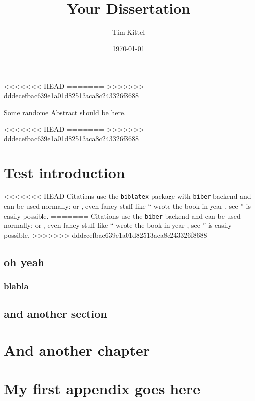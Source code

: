 \documentclass{simple-dissertation}
\title{Your Dissertation}
\date{\today}
\author{Tim Kittel}
\begin{document}
\maketitle

\pagestyle{thesis-preface}

<<<<<<< HEAD
=======
>>>>>>> dddecefbac639e1a01d82513aca8c243326f8688

Some randome Abstract should be here.

<<<<<<< HEAD
=======
>>>>>>> dddecefbac639e1a01d82513aca8c243326f8688


\cleartorecto
\tableofcontents

\cleartorecto
\pagestyle{thesis}

\chapter{Test introduction}

<<<<<<< HEAD
Citations use the \verb|biblatex| package with \verb|biber| backend and can be used normally: \cite{heitzig2016topology} or \citet{heitzig2016topology}, even fancy stuff like ``\citeauthor{kuznetsov1998elements} wrote the book  in year \citeyear{kuznetsov1998elements}, see \cite{kuznetsov1998elements}'' is easily possible.
=======
Citations use the \verb|biber| backend and can be used normally: \cite{heitzig2016topology} or \citet{heitzig2016topology}, even fancy stuff like ``\citeauthor{kuznetsov1998elements} wrote the book  in year \citeyear{kuznetsov1998elements}, see \cite{kuznetsov1998elements}'' is easily possible.
>>>>>>> dddecefbac639e1a01d82513aca8c243326f8688

\lipsum

\section{oh yeah}

\subsection{blabla}

\section{and another section}

\lipsum

\chapter{And another chapter}


\lipsum

\appendix
\chapter{My first appendix goes here}



\printbibliography
\end{document}
